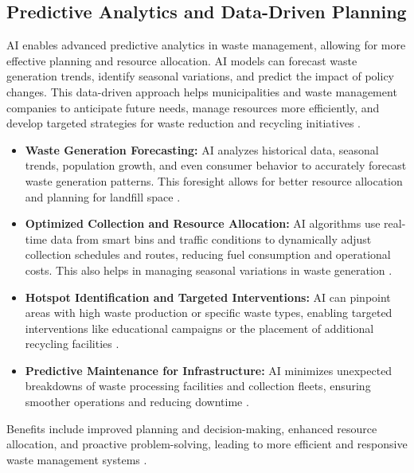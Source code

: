 \subsection{Predictive Analytics and Data-Driven Planning}
AI enables advanced predictive analytics in waste management, allowing for more effective planning and resource allocation. AI models can forecast waste generation trends, identify seasonal variations, and predict the impact of policy changes. This data-driven approach helps municipalities and waste management companies to anticipate future needs, manage resources more efficiently, and develop targeted strategies for waste reduction and recycling initiatives \cite{kordana2023artificial}.
\begin{itemize}
    \item \textbf{Waste Generation Forecasting:} AI analyzes historical data, seasonal trends, population growth, and even consumer behavior to accurately forecast waste generation patterns. This foresight allows for better resource allocation and planning for landfill space \cite{GlobalTrashSolutions_Predictive, Scilit_Predictive}.
    \item \textbf{Optimized Collection and Resource Allocation:} AI algorithms use real-time data from smart bins and traffic conditions to dynamically adjust collection schedules and routes, reducing fuel consumption and operational costs. This also helps in managing seasonal variations in waste generation \cite{SustainabilityDirectory_Predictive_1, SustainabilityDirectory_Predictive_2}.
    \item \textbf{Hotspot Identification and Targeted Interventions:} AI can pinpoint areas with high waste production or specific waste types, enabling targeted interventions like educational campaigns or the placement of additional recycling facilities \cite{ITU_Predictive}.
    \item \textbf{Predictive Maintenance for Infrastructure:} AI minimizes unexpected breakdowns of waste processing facilities and collection fleets, ensuring smoother operations and reducing downtime \cite{SWANA_Predictive}.
\end{itemize}
Benefits include improved planning and decision-making, enhanced resource allocation, and proactive problem-solving, leading to more efficient and responsive waste management systems \cite{Vectoral_Predictive, AtlasDisposal_Predictive}.

